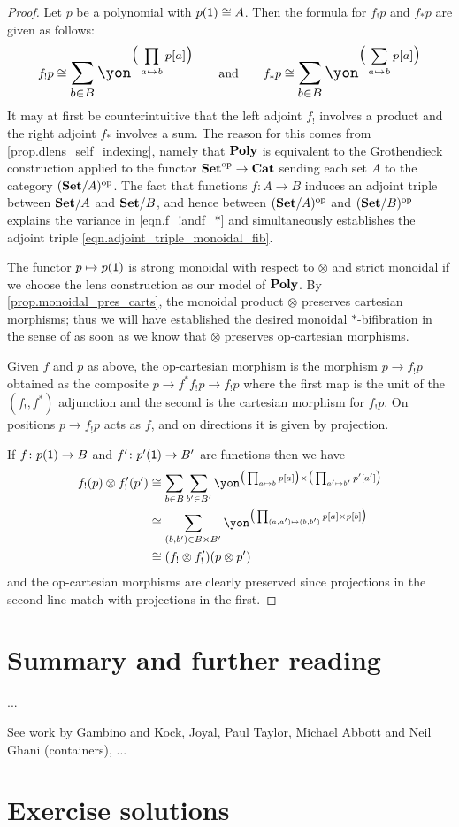 \documentclass[Book-Poly]{subfiles}
\begin{document}
\begin{proof}
Let $p$ be a polynomial with $p(\textsf{1})\cong A$. Then the formula for $f_!p$ and $f_*p$ are given as follows:
\begin{equation}\label{eqn.f_!andf_*}
f_!p\cong\scalebox{1.3}{$\displaystyle\sum_{b\in B}\yon^{\big(\prod\limits_{a\mapsto b}p[a]\big)}$}
\qqand
f_*p\cong\scalebox{1.3}{$\displaystyle\sum_{b\in B}\yon^{\big(\sum\limits_{a\mapsto b}p[a]\big)}$}
\end{equation}
It may at first be counterintuitive that the left adjoint $f_!$ involves a product and the right adjoint $f_*$ involves a sum. The reason for this comes from \cref{prop.dlens_self_indexing}, namely that $\mathbf{Poly}$ is equivalent to the Grothendieck construction applied to the functor $\mathbf{Set}^{\textnormal{op}}\to\mathbf{Cat}$ sending each set $A$ to the category $(\mathbf{Set}/A)^{\textnormal{op}}$. The fact that functions $f\colon A\to B$ induces an adjoint triple between $\mathbf{Set}/A$ and $\mathbf{Set}/B$, and hence between $(\mathbf{Set}/A)^{\textnormal{op}}$ and $(\mathbf{Set}/B)^{\textnormal{op}}$ explains the variance in \eqref{eqn.f_!andf_*} and simultaneously establishes the adjoint triple \eqref{eqn.adjoint_triple_monoidal_fib}.

The functor $p\mapsto p(\textsf{1})$ is strong monoidal with respect to $\otimes$ and strict monoidal if we choose the lens construction as our model of $\mathbf{Poly}$. By \cref{prop.monoidal_pres_carts}, the monoidal product $\otimes$ preserves cartesian morphisms; thus we will have established the desired monoidal $*$-bifibration in the sense of \cite[Definition 12.1]{shulman2008framed} as soon as we know that $\otimes$ preserves op-cartesian morphisms.

Given $f$ and $p$ as above, the op-cartesian morphism is the morphism $p\to f_!p$ obtained as the composite $p\to f^*f_!p\to f_!p$ where the first map is the unit of the $(f_!,f^*)$ adjunction and the second is the cartesian morphism for $f_!p$. On positions $p\to f_!p$ acts as $f$, and on directions it is given by projection. 

If $f\colon p(\textsf{1})\to B$ and $f'\colon p'(\textsf{1})\to B'$ are functions then we have
\begin{align*}
	f_!(p)\otimes f'_!(p')&\cong
	\sum_{b\in B}\sum_{b'\in B'}\yon^{\big(\prod_{a\mapsto b}p[a]\big)\times\big(\prod_{a'\mapsto b'}p'[a']\big)}\\&\cong
	\sum_{(b,b')\in B\times B'}\yon^{\big(\prod_{(a,a')\mapsto(b,b')}p[a]\times p[b]\big)}\\&
	\cong (f_!\otimes f'_!)(p\otimes p')
\end{align*}
and the op-cartesian morphisms are clearly preserved since projections in the second line match with projections in the first.
\end{proof}

\section{Summary and further reading}

...

See work by Gambino and Kock, Joyal, Paul Taylor, Michael Abbott and Neil Ghani (containers), ...


\section{Exercise solutions}
{\footnotesize
}
\end{document}
